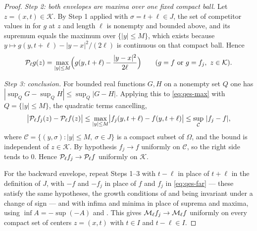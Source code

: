 \begin{proof}
\emph{Step 2: both envelopes are maxima over one fixed compact ball.}
Let $z=(x,t)\in\mathcal K$. By Step 1 applied with $\sigma=t+\ell\in J$, the set
of competitor values in  for $g$ at $z$ and length $\ell$ is
nonempty and bounded above, and its supremum equals the maximum over
$\{|y|\le M\}$, which exists because $y\mapsto g(y,t+\ell)-|y-x|^2/(2\ell)$ is
continuous on that compact ball. Hence
\begin{equation}\label{eq:qes-max}
  \mathcal{P}_\ell g(z)=\max_{|y|\le M}
     \Bigl(g(y,t+\ell)-\frac{|y-x|^2}{2\ell}\Bigr)
  \qquad(g=f\text{ or }g=f_j,\ z\in\mathcal K).
\end{equation}

\emph{Step 3: conclusion.}
For bounded real functions $G,H$ on a nonempty set $Q$ one has
$|\sup_QG-\sup_QH|\le\sup_Q|G-H|$. Applying this to
\eqref{eq:qes-max} with $Q=\{|y|\le M\}$, the quadratic terms cancelling,
\[
  \bigl|\mathcal{P}_\ell f_j(z)-\mathcal{P}_\ell f(z)\bigr|
   \le\max_{|y|\le M}\bigl|f_j(y,t+\ell)-f(y,t+\ell)\bigr|
   \le\sup_{\mathcal C}\,|f_j-f| ,
\]
where $\mathcal C=\{(y,\sigma):|y|\le M,\ \sigma\in J\}$ is a compact subset of
$\Omega$, and the bound is independent of $z\in\mathcal K$. By hypothesis
$f_j\to f$ uniformly on $\mathcal C$, so the right side tends to $0$. Hence
$\mathcal{P}_\ell f_j\to\mathcal{P}_\ell f$ uniformly on $\mathcal K$.

For the backward envelope, repeat Steps 1--3 with $t-\ell$ in place of
$t+\ell$ in the definition of $J$, with $-f$ and $-f_j$ in place of $f$ and
$f_j$ in \eqref{eq:qes-far} — these satisfy the same hypotheses, the growth
conditions of  and
 being invariant under a change of sign — and
with infima and minima in place of suprema and maxima, using
$\inf A=-\sup(-A)$ and . This gives
$\mathcal{M}_\ell f_j\to\mathcal{M}_\ell f$ uniformly on every compact set of centers
$z=(x,t)$ with $t\in I$ and $t-\ell\in I$.
\end{proof}
